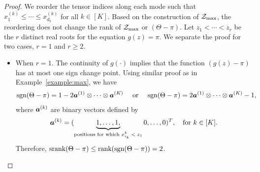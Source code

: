 \documentclass[11pt]{article}
\theoremstyle{plain}
\theoremstyle{definition}
\newcommand*{\KeepStyleUnderBrace}[1]{%
  \mathop{%
    \mathchoice
    {\underbrace{\displaystyle#1}}%
    {\underbrace{\textstyle#1}}%
    {\underbrace{\scriptstyle#1}}%
    {\underbrace{\scriptscriptstyle#1}}%
  }\limits
}
\def\sign{\textup{sgn}}
\def\srank{\textup{srank}}
\def\rank{\textup{rank}}
\begin{document}
\begin{proof} 
We reorder the tensor indices along each mode such that $x^{(k)}_{1}\leq \cdots \leq x^{(k)}_{d_k}$ for all $k\in[K]$. Based on the construction of $\mathcal{Z}_{\max}$, the reordering does not change the rank of $\mathcal{Z}_{\max}$ or $(\Theta-\pi)$. Let $z_1<\cdots<z_r$ be the $r$ distinct real roots for the equation $g(z)=\pi$. We separate the proof for two cases, $r=1$ and $r\geq 2$. 

\begin{itemize}[leftmargin=*,topsep=0pt,itemsep=-1ex,partopsep=1ex,parsep=1ex]
\item When $r=1$. The continuity of $g(\cdot)$ implies that the function $(g(z)-\pi)$ has at most one sign change point. Using similar proof as in Example~\ref{example:max}, we have
\begin{align}
&\sign(\Theta-\pi)=1-2\ma^{(1)}\otimes\cdots\otimes \ma^{(K)}\quad \text{ or } \quad \sign(\Theta-\pi) = 2\ma^{(1)}\otimes\cdots\otimes \ma^{(K)} -1,
\end{align}
where $\bm{a}^{(k)}$ are binary vectors defined by
\[
\ma^{(k)}=(\KeepStyleUnderBrace{1,\ldots,1,}_{\text{positions for which $x_{i_k}^{k}<z_1$}}0,\ldots,0)^T, \quad \text{for }k\in[K].
\]
Therefore, $\srank(\Theta-\pi)\leq \rank(\sign(\Theta-\pi)) = 2$. 


\end{itemize}
\end{proof}
\end{document}
